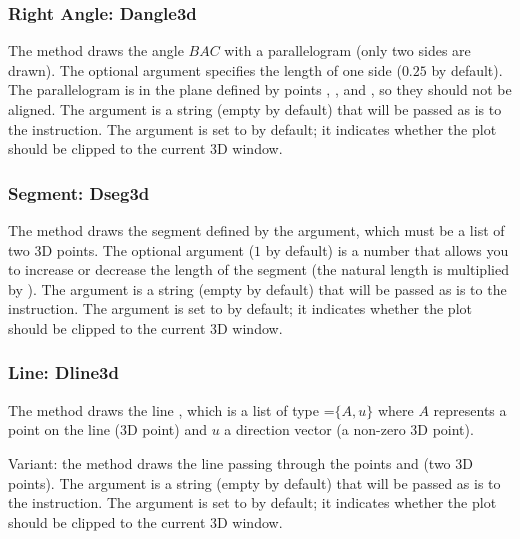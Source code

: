 \subsubsection{Right Angle: Dangle3d}

The  method draws the angle \(BAC\) with a parallelogram (only two sides are drawn). The optional argument  specifies the length of one side ($0.25$ by default). The parallelogram is in the plane defined by points , , and , so they should not be aligned. The  argument is a string (empty by default) that will be passed as is to the \drawcmd instruction. The  argument is set to \false by default; it indicates whether the plot should be clipped to the current 3D window.

\subsubsection{Segment: Dseg3d}

The  method draws the segment defined by the  argument, which must be a list of two 3D points. The optional  argument ($1$ by default) is a number that allows you to increase or decrease the length of the segment (the natural length is multiplied by ). The  argument is a string (empty by default) that will be passed as is to the \drawcmd instruction. The  argument is set to \false by default; it indicates whether the plot should be clipped to the current 3D window.

    
\subsubsection{Line: Dline3d}

The method  draws the line , which is a list of type =$\{A,u\}$ where $A$ represents a point on the line (3D point) and $u$ a direction vector (a non-zero 3D point).

Variant: the method  draws the line passing through the points  and  (two 3D points). The  argument is a string (empty by default) that will be passed as is to the \drawcmd instruction. The  argument is set to \false by default; it indicates whether the plot should be clipped to the current 3D window.


